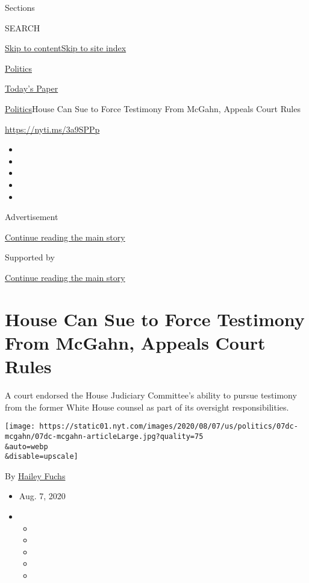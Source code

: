 Sections

SEARCH

\protect\hyperlink{site-content}{Skip to
content}\protect\hyperlink{site-index}{Skip to site index}

\href{https://www.nytimes.com/section/politics}{Politics}

\href{https://myaccount.nytimes.com/auth/login?response_type=cookie\&client_id=vi}{}

\href{https://www.nytimes.com/section/todayspaper}{Today's Paper}

\href{/section/politics}{Politics}\textbar{}House Can Sue to Force
Testimony From McGahn, Appeals Court Rules

\href{https://nyti.ms/3a9SPPp}{https://nyti.ms/3a9SPPp}

\begin{itemize}
\item
\item
\item
\item
\item
\end{itemize}

Advertisement

\protect\hyperlink{after-top}{Continue reading the main story}

Supported by

\protect\hyperlink{after-sponsor}{Continue reading the main story}

\hypertarget{house-can-sue-to-force-testimony-from-mcgahn-appeals-court-rules}{%
\section{House Can Sue to Force Testimony From McGahn, Appeals Court
Rules}\label{house-can-sue-to-force-testimony-from-mcgahn-appeals-court-rules}}

A court endorsed the House Judiciary Committee's ability to pursue
testimony from the former White House counsel as part of its oversight
responsibilities.

\texttt{[image: https://static01.nyt.com/images/2020/08/07/us/politics/07dc-mcgahn/07dc-mcgahn-articleLarge.jpg?quality=75\\\&auto=webp\\\&disable=upscale]}

By \href{https://www.nytimes.com/by/hailey-fuchs}{Hailey Fuchs}

\begin{itemize}
\item
  Aug. 7, 2020
\item
  \begin{itemize}
  \item
  \item
  \item
  \item
  \item
  \end{itemize}
\end{itemize}

